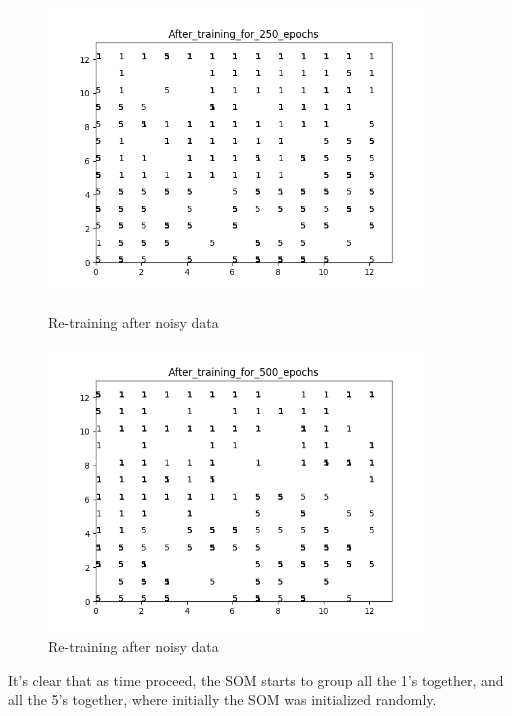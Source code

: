 \documentclass[11pt]{article}
\begin{document}
\begin{enumerate}
\begin{enumerate}
\begin{figure}[h!]
\begin{minipage}{0.45\textwidth}
         \includegraphics[width=0.9\textwidth]{After_training_for_250_epochs}
         \caption{Re-training after noisy data}
    \end{minipage}\hfill
    \begin{minipage}{0.45\textwidth}
    	\centering
         \includegraphics[width=0.9\textwidth]{After_training_for_500_epochs}
         \caption{Re-training after noisy data}
    \end{minipage}\hfill
\end{figure}
It's clear that as time proceed, the SOM starts to group all the 1's together, and all the 5's together, where initially the SOM was initialized randomly.


\end{enumerate}
\end{enumerate}
\end{document}
